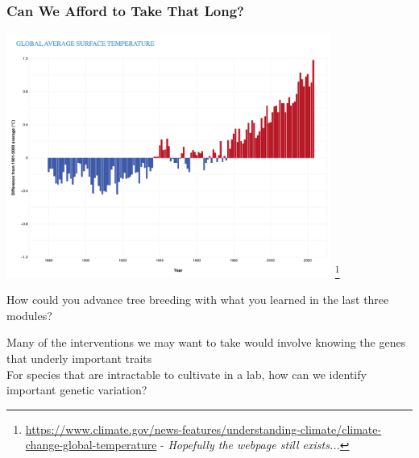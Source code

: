\documentclass[xcolor=dvipsnames]{beamer}
\newcommand\blfootnote[1]{%
	\begingroup
	\renewcommand\thefootnote{}\footnote{#1}%
	\addtocounter{footnote}{-1}%
	\endgroup
}
\begin{document}
\begin{frame}
\frametitle{Can We Afford to Take That Long?}
\centering
	\includegraphics[keepaspectratio, width  = 0.8\textwidth]{img/graph_globalavgsurfacetemp}
	\blfootnote{\url{https://www.climate.gov/news-features/understanding-climate/climate-change-global-temperature} - \textit{Hopefully the webpage still exists...}}
\end{frame}




\begin{frame}
	\Huge How could you advance tree breeding with what you learned in the last three modules?
\end{frame}

\begin{frame}
\Large
	Many of the interventions we may want to take would involve knowing the genes that underly important traits \\
	
	\vspace{20pt}
	For species that are intractable to cultivate in a lab, how can we identify important genetic variation?
\end{frame}
\end{document}
